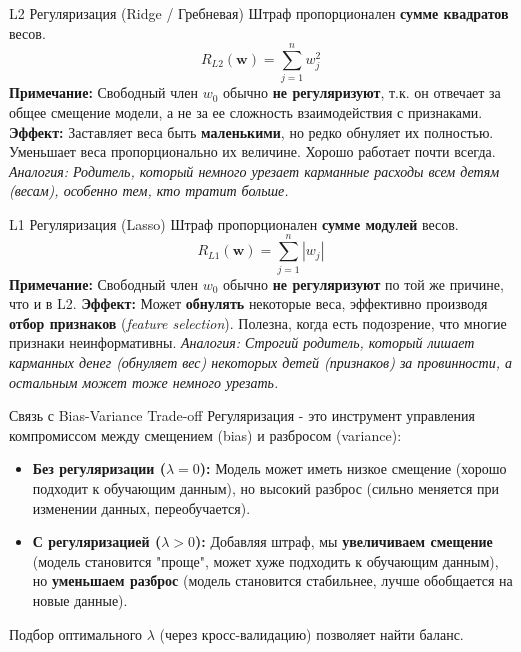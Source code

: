 \begin{myblock}{L2 Регуляризация (Ridge / Гребневая)}
Штраф пропорционален \textbf{сумме квадратов} весов.
\[
R_{L2}(\mathbf{w}) = \sum_{j=1}^{n} w_j^2
\]
\textbf{Примечание:} Свободный член $w_0$ обычно \textbf{не регуляризуют}, т.к. он отвечает за общее смещение модели, а не за ее сложность взаимодействия с признаками.
\textbf{Эффект:} Заставляет веса быть \textbf{маленькими}, но редко обнуляет их полностью. Уменьшает веса пропорционально их величине. Хорошо работает почти всегда.
\textit{Аналогия: Родитель, который немного урезает карманные расходы всем детям (весам), особенно тем, кто тратит больше.}
\end{myblock}

\begin{myblock}{L1 Регуляризация (Lasso)}
Штраф пропорционален \textbf{сумме модулей} весов.
\[
R_{L1}(\mathbf{w}) = \sum_{j=1}^{n} |w_j|
\]
\textbf{Примечание:} Свободный член $w_0$ обычно \textbf{не регуляризуют} по той же причине, что и в L2.
\textbf{Эффект:} Может \textbf{обнулять} некоторые веса, эффективно производя \textbf{отбор признаков} (\textit{feature selection}). Полезна, когда есть подозрение, что многие признаки неинформативны.
\textit{Аналогия: Строгий родитель, который лишает карманных денег (обнуляет вес) некоторых детей (признаков) за провинности, а остальным может тоже немного урезать.}
\end{myblock}

\begin{myexampleblock}{Связь с Bias-Variance Trade-off}
Регуляризация - это инструмент управления компромиссом между смещением (bias) и разбросом (variance):
\begin{itemize}
    \item \textbf{Без регуляризации ($\lambda=0$):} Модель может иметь низкое смещение (хорошо подходит к обучающим данным), но высокий разброс (сильно меняется при изменении данных, переобучается).
    \item \textbf{С регуляризацией ($\lambda > 0$):} Добавляя штраф, мы \textbf{увеличиваем смещение} (модель становится "проще", может хуже подходить к обучающим данным), но \textbf{уменьшаем разброс} (модель становится стабильнее, лучше обобщается на новые данные).
\end{itemize}
Подбор оптимального $\lambda$ (через кросс-валидацию) позволяет найти баланс.
\end{myexampleblock}

